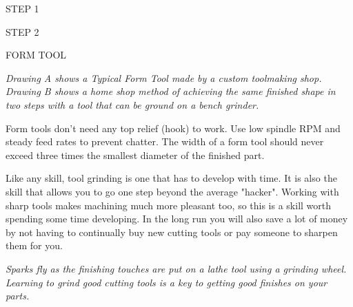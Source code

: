 STEP 1
                     
STEP 2

FORM TOOL
\bigskip

\textit{Drawing A shows a Typical Form Tool made by a custom toolmaking shop.
Drawing B shows a home shop method of achieving the same finished shape in two
steps with a tool that can be ground on a bench grinder.}
\bigskip

Form tools don't need any top relief (hook) to work. Use low spindle RPM and
steady feed rates to prevent chatter. The width of a form tool should never
exceed three times the smallest diameter of the finished part.

Like any skill, tool grinding is one that has to develop with time. It is also
the skill that allows you to go one step beyond the average "hacker". Working
with sharp tools makes machining much more pleasant too, so this is a skill
worth spending some time developing. In the long run you will also save a lot of
money by not having to continually buy new cutting tools or pay someone to
sharpen them for you.

\bigskip
\textit{Sparks fly as the finishing touches are put on a lathe tool using a
grinding wheel. Learning to grind good cutting tools is a key to getting good
finishes on your parts.}
\bigskip



\secup

\secup
